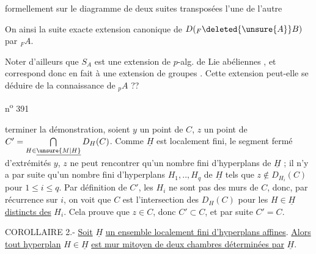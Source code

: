 formellement sur le  diagramme de deux suites transposées l'une de l'autre

On  ainsi la suite exacte
extension canonique de $D({}_F\deleted{\unsure{A}}B)$ par $ {}_F A$.

Noter d'ailleurs que $S_A$ est une extension de $p$-alg. de Lie abéliennes , et correspond donc en fait à une extension de groupes . Cette extension peut-elle se déduire de la connaissance de $ {}_p A$ ??

n\textsuperscript{o} 391

terminer la démonstration, soient $y$ un point de $C$, $z$ un point de $C'=\bigcap\limits_{H\in\underline{\unsure{M|H}}}D_H(C)$. Comme $\underline{H}$ est localement fini, le segment fermé d'extrémités $y$, $z$ ne peut rencontrer qu'un nombre fini d'hyperplans de $\underline{H}$ ; il n'y a par suite qu'un nombre fini d'hyperplans $H_1,..,H_q$ de $\underline{H}$ tels que $z\notin D_{H_i}(C)$ pour $1\leq i\leq q$. Par définition de $C'$, les $H_i$ ne sont pas des murs de $C$, donc, par récurrence sur $i$, on voit que $C$ est l'intersection des $D_H(C)$ pour les $H\in\underline{H}$ \uline{distincts des} $H_i$. Cela prouve que $z\in C$, donc $C'\subset C$, et par suite $C'=C$.

COROLLAIRE 2.- \uline{Soit} $\underline{H}$ \uline{un ensemble localement fini d'hyperplans affines}. \uline{Alors tout hyperplan} $H\in\underline{H}$ \uline{est mur mitoyen de deux chambres déterminées par} $\underline{H}$.

